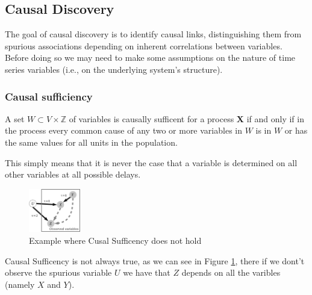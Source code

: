 
\subsection{Causal Discovery}
The goal of causal discovery is to identify causal links, distinguishing them from spurious associations depending on inherent
correlations between variables.
Before doing so we may need to make some assumptions on the nature of time series variables
(i.e., on the underlying system's structure).

\subsubsection*{Causal sufficiency}
\begin{tcolorbox}[colback=red!5!white,colframe=red!75!black,title=\textbf{Causal sufficiency Definition}]
    A set $W\subset V\times\mathbb{Z}$ of variables is causally sufficent for a process \textbf{X} if and only if in the process 
    every common cause of any two or more variables in $W$ is in $W$ or has the same values for all units in the population.
\end{tcolorbox}
This simply means that it is never the case that a variable is determined on all other variables at all possible delays.\\
\begin{figure}[H]
    \centering
    \includegraphics[width=0.2\textwidth]{img/causalsuff.jpeg}
    \caption{Example where Cusal Sufficency does not hold}
    \label{fig:causalsuff}
\end{figure}
Causal Sufficency is not always true, as we can see in Figure \ref{fig:causalsuff}, there if we dont't
observe the spurious variable $U$ we have that $Z$ depends on all the varibles (namely $X$ and $Y$).

